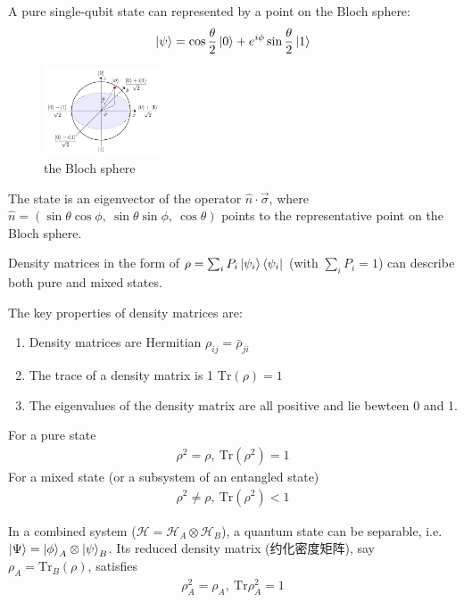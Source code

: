 A pure single-qubit state can represented by a point on the Bloch sphere:
\begin{align*}
    \ket{\psi}=\cos\frac{\theta}{2}\ket{0}+e^{i\phi}\sin\frac{\theta}{2}\ket{1}
\end{align*}

\begin{figure}[!htb]
    \centering
    \includegraphics[width=0.309\textwidth]{pic/Review/the Bloch sphere.png}
    \caption{the Bloch sphere}
\end{figure}


The state is an eigenvector of the operator $\hat{n}\cdot \vec{\sigma}$, where $\hat{n}=(\sin\theta\cos\phi,\ \sin\theta\sin\phi,\ \cos\theta)$ points to the representative point on the Bloch sphere. 


Density matrices in the form of $\rho=\sum_i P_i\ket{\psi_i}\bra{\psi_i}$ (with $\sum_i P_i=1$) can describe both pure and mixed states.

The key properties of density matrices are:
\begin{enumerate}
    \item Density matrices are Hermitian $\rho_{ij}=\bar{\rho}_{ji}$
    \item The trace of a density matrix is 1 $\mathrm{Tr}(\rho)=1$
    \item The eigenvalues of the density matrix are all positive and lie bewteen 0 and 1.
\end{enumerate}
For a pure state
\begin{align*}
    \rho^2=\rho,\ \mathrm{Tr}(\rho^2)=1
\end{align*}
For a mixed state (or a subsystem of an entangled state)
\begin{align*}
    \rho^2\ne \rho,\ \mathrm{Tr}(\rho^2)<1
\end{align*}

In a combined system ($\mathcal{H} =\mathcal{H}_A\otimes\mathcal{H}_B$), a quantum state can be separable, i.e.$\ket{\Psi}=\ket{\phi}_A\otimes\ket{\psi}_B$. Its reduced density matrix (约化密度矩阵), say $\rho_A=\mathrm{Tr}_B(\rho)$, satisfies
\begin{align*}
    \rho_A^2=\rho_A,\ \mathrm{Tr} \rho_A^2=1
\end{align*}

